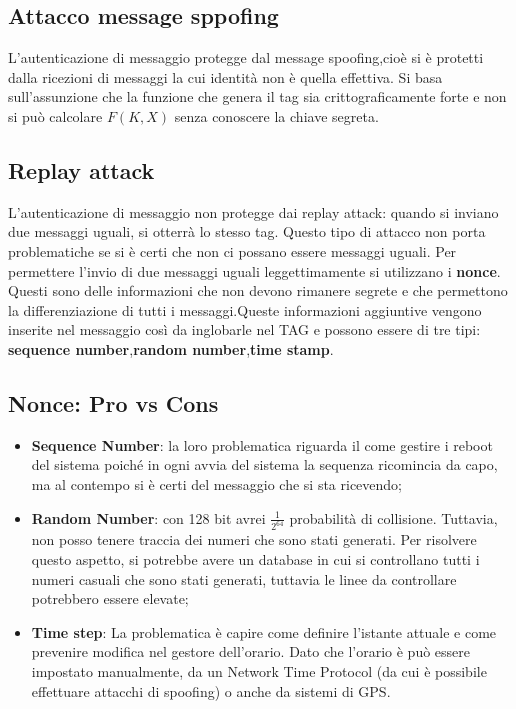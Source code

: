 \documentclass{article}
\theoremstyle{remark}
\begin{document}
\subsection{Attacco message sppofing}
L'autenticazione di messaggio protegge dal message spoofing,cioè si è protetti dalla ricezioni di messaggi la cui identità non è quella effettiva. Si basa sull'assunzione che la funzione che genera il tag sia crittograficamente forte e non si può calcolare $F(K,X)$ senza conoscere la chiave segreta.
\subsection{Replay attack}
L'autenticazione di messaggio non protegge dai replay attack: quando si inviano due messaggi uguali, si otterrà lo stesso tag. Questo tipo di attacco non porta problematiche se si è certi che non ci possano essere messaggi uguali.
Per permettere l'invio di due messaggi uguali leggettimamente si utilizzano i \textbf{nonce}. Questi sono delle informazioni che non devono rimanere segrete e che permettono la differenziazione di tutti i messaggi.\newline Queste informazioni aggiuntive vengono inserite nel messaggio così da inglobarle nel TAG e possono essere di tre tipi: \textbf{sequence number},\textbf{random number},\textbf{time stamp}.
\subsection{Nonce: Pro vs Cons}
\begin{itemize}
	\item \textbf{Sequence Number}: la loro problematica riguarda il come gestire i reboot del sistema poiché in ogni avvia del sistema la sequenza ricomincia da capo, ma al contempo si è certi del messaggio che si sta ricevendo;
	\item \textbf{Random Number}: con 128 bit avrei $\frac{1}{2^{64}}$ probabilità di collisione. Tuttavia, non posso tenere traccia dei numeri che sono stati generati. Per risolvere questo aspetto, si potrebbe avere un database in cui si controllano tutti i numeri casuali che sono stati generati, tuttavia le linee da controllare potrebbero essere elevate;
	\item \textbf{Time step}: La problematica è capire come definire l'istante attuale e come prevenire modifica nel gestore dell'orario. Dato che l'orario è può essere impostato manualmente, da un Network Time Protocol (da cui è possibile effettuare attacchi di spoofing) o anche da sistemi di GPS.
\end{itemize}
\end{document}
